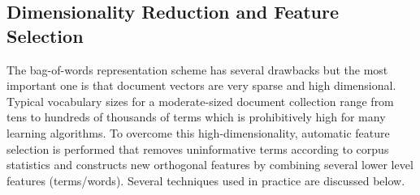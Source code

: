 
\subsection{Dimensionality Reduction and Feature Selection}
\label{sec:rw_dr}
The bag-of-words representation scheme has several drawbacks but the most important one is that document vectors are very sparse and high dimensional. Typical vocabulary sizes for a moderate-sized document collection range from tens to hundreds of thousands of terms which is prohibitively high for many learning algorithms. 
To overcome this high-dimensionality, automatic feature selection is performed that removes uninformative terms according to corpus statistics and constructs new orthogonal features by combining several lower level features (terms/words). Several techniques used in practice are discussed below.


